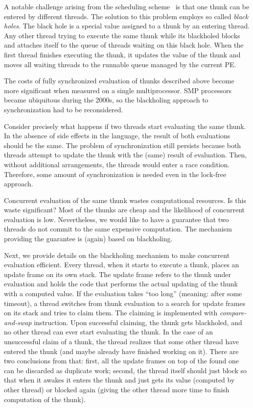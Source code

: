 \documentclass[11pt]{extarticle}
\begin{document}
A notable challenge arising from the scheduling scheme~\cite{Trinder96} is that one thunk can be entered by different threads. The solution to this problem employs so called \emph{black holes}. The black hole is a special value assigned to a thunk by an entering thread. Any other thread trying to execute the same thunk while its blackholed blocks and attaches itself to the queue of threads waiting on this black hole. When the first thread finishes executing the thunk, it updates the value of the thunk and moves all waiting threads to the runnable queue managed by the current PE.

The costs of fully synchronized evaluation of thunks described above become more significant when measured on a single multiprocessor. SMP processors became ubiquitous during the 2000s, so the blackholing approach to synchronization had to be reconsidered.

Consider precisely what happens if two threads start evaluating the same thunk. In the absence of side effects in the language, the result of both evaluations should be the same. The problem of synchronization still persists because both threads attempt to update the thunk with the (same) result of evaluation. Then, without additional arrangements, the threads would enter a race condition. Therefore, some amount of synchronization is needed even in the lock-free approach.

Concurrent evaluation of the same thunk wastes computational resources. Is this waste significant? Most of the thunks are cheap and the likelihood of concurrent evaluation is low. Nevertheless, we would like to have a guarantee that two threads do not commit to the same expensive computation. The mechanism providing the guarantee is (again) based on blackholing. 

Next, we provide details on the blackholing mechanism to make concurrent evaluation efficient.
Every thread, when it starts to execute a thunk, places an update frame on its own stack. The update frame refers to the thunk under evaluation and holds the code that performs the actual updating of the thunk with a computed value. If the evaluation takes ``too long'' (meaning: after some timeout), a thread switches from thunk evaluation to a search for update frames on its stack and tries to claim them. The claiming is implemented with \textit{compare-and-swap} instruction. Upon successful claiming, the thunk gets blackholed, and no other thread can ever start evaluating the thunk. In the case of an unsuccessful claim of a thunk, the thread realizes that some other thread have entered the thunk (and maybe already have finished working on it). There are two conclusions from that: first, all the update frames on top of the found one can be discarded as duplicate work; second, the thread itself should just block so that when it awakes it enters the thunk and just gets its value (computed by other thread) or blocked again (giving the other thread more time to finish computation of the thunk).
\end{document}
